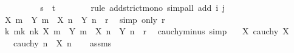 \begin{isabellebody}
\ \ \ \ \isamarkupfalse%
\ \isamarkupfalse%
\ {\isachardoublequoteopen}{\isasymdots}\ {\isacharless}{\kern0pt}\ s\ {\isacharplus}{\kern0pt}\ t{\isachardoublequoteclose}\isanewline
\ \ \ \ \ \ \isamarkupfalse%
\ {\isacharparenleft}{\kern0pt}rule\ add{\isacharunderscore}{\kern0pt}strict{\isacharunderscore}{\kern0pt}mono{\isacharparenright}{\kern0pt}\ {\isacharparenleft}{\kern0pt}simp{\isacharunderscore}{\kern0pt}all\ add{\isacharcolon}{\kern0pt}\ i\ j\ {\isacharasterisk}{\kern0pt}{\isacharparenright}{\kern0pt}\isanewline
\ \ \ \ \isamarkupfalse%
\ \isamarkupfalse%
\ {\isachardoublequoteopen}{\isasymbar}{\isacharparenleft}{\kern0pt}X\ m\ {\isacharplus}{\kern0pt}\ Y\ m{\isacharparenright}{\kern0pt}\ {\isacharminus}{\kern0pt}\ {\isacharparenleft}{\kern0pt}X\ n\ {\isacharplus}{\kern0pt}\ Y\ n{\isacharparenright}{\kern0pt}{\isasymbar}\ {\isacharless}{\kern0pt}\ r{\isachardoublequoteclose}\ \isamarkupfalse%
\ {\isacharparenleft}{\kern0pt}simp\ only{\isacharcolon}{\kern0pt}\ r{\isacharparenright}{\kern0pt}\isanewline
\ \ \isamarkupfalse%
\isanewline
\ \ \isamarkupfalse%
\ \isamarkupfalse%
\ {\isachardoublequoteopen}{\isasymexists}k{\isachardot}{\kern0pt}\ {\isasymforall}m{\isasymge}k{\isachardot}{\kern0pt}\ {\isasymforall}n{\isasymge}k{\isachardot}{\kern0pt}\ {\isasymbar}{\isacharparenleft}{\kern0pt}X\ m\ {\isacharplus}{\kern0pt}\ Y\ m{\isacharparenright}{\kern0pt}\ {\isacharminus}{\kern0pt}\ {\isacharparenleft}{\kern0pt}X\ n\ {\isacharplus}{\kern0pt}\ Y\ n{\isacharparenright}{\kern0pt}{\isasymbar}\ {\isacharless}{\kern0pt}\ r{\isachardoublequoteclose}\ \isacommand{{\isachardot}{\kern0pt}{\isachardot}{\kern0pt}}\isamarkupfalse%
\isanewline
{}\isamarkupfalse%
%
\endisatagproof
{\isafoldproof}%
%
\isadelimproof
\isanewline
%
\endisadelimproof
\isanewline
{}\isamarkupfalse%
\ cauchy{\isacharunderscore}{\kern0pt}minus\ {\isacharbrackleft}{\kern0pt}simp{\isacharbrackright}{\kern0pt}{\isacharcolon}{\kern0pt}\isanewline
\ \ \ X{\isacharcolon}{\kern0pt}\ {\isachardoublequoteopen}cauchy\ X{\isachardoublequoteclose}\isanewline
\ \ \ {\isachardoublequoteopen}cauchy\ {\isacharparenleft}{\kern0pt}{\isasymlambda}n{\isachardot}{\kern0pt}\ {\isacharminus}{\kern0pt}\ X\ n{\isacharparenright}{\kern0pt}{\isachardoublequoteclose}\isanewline
%
\isadelimproof
\ \ %
\endisadelimproof
%
\isatagproof
{}\isamarkupfalse%
\ assms\ \isamarkupfalse%

\end{isabellebody}
